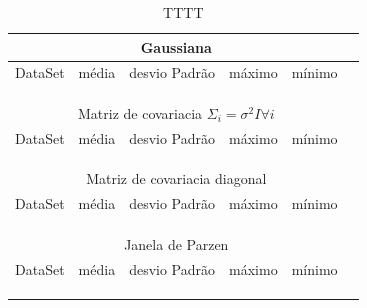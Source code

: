 \documentclass[ 
	article,			%
	11pt,				%
	oneside,			%
	a4paper,			%
	english,			%
	brazil,				%
	]{abntex2}
\begin{document}
\begin{table}
	\centering
    \begin{tabular}{|c|c|c|c|c|c}%
		  \multicolumn{5}{c}{Gaussiana}\\ \hline
          \hline DataSet & média & desvio Padrão & máximo & mínimo \\ \hline
           \\ \hline
           \\ \hline
           \\ \hline
		  
		  \multicolumn{5}{c}{Matriz de covariacia $\Sigma_i=\sigma^2I \forall
		  i$}\\
		  \hline \hline DataSet & média & desvio Padrão & máximo & mínimo \\ \hline
           \\ \hline
           \\ \hline
           \\ \hline 
		  
		  \multicolumn{5}{c}{Matriz de covariacia diagonal}\\ \hline
          \hline DataSet & média & desvio Padrão & máximo & mínimo \\ \hline
           \\ \hline
           \\ \hline
           \\ \hline     
		  
		  \multicolumn{5}{c}{Janela de Parzen}\\ \hline
          \hline DataSet & média & desvio Padrão & máximo & mínimo \\ \hline
           \\ \hline
           \\ \hline
          
          \\ \hline
    \end{tabular}
    \caption{TTTT}
    \label{tab:acuracia}
\end{table}
\end{document}
